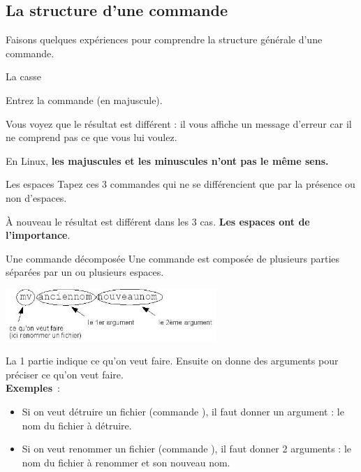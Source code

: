 \documentclass[a4paper,11pt]{style-esi/td}
\begin{document}
	\subsection{La structure d'une commande}

		Faisons quelques expériences pour comprendre
		la structure générale d'une commande.

		\begin{Experience}{La casse} 
			\vspace{-1em}
			\begin{steps}
				\item Entrez la commande  (en majuscule).
			\end{steps}
			Vous voyez que le résultat est différent :
			il vous affiche un message d'erreur 
			car il ne comprend pas ce que vous lui voulez.
			\begin{infobox}
				En Linux, 
				\textbf{les majuscules et les minuscules n'ont pas le même sens.}
			\end{infobox}
		\end{Experience}	
			
		\begin{Experience}{Les espaces} 
			Tapez ces 3 commandes qui ne se différencient 
			que par la présence ou non d'espaces.
			\begin{steps}
			\item \kbd{ls dev1}
			\item \kbd{lsdev1}
			\item \kbd{ls dev 1}
			\end{steps}
			À nouveau le résultat est différent dans les 3 cas. 
			\textbf{Les espaces ont de l'importance}.
		\end{Experience}				

		\begin{theorie}{Une commande décomposée}
			Une commande est composée de plusieurs parties 
			séparées par un ou plusieurs espaces. 
			\begin{center}
				\includegraphics[width=0.6\textwidth]{images/commande.jpg}
			\end{center}
			La 1\iere{} partie indique ce qu'on veut faire. 
			Ensuite on donne des arguments pour préciser ce qu'on veut faire.
			\\
			\textbf{Exemples} :
			\begin{itemize}
			\item 
				Si on veut détruire un fichier (commande ), 
				il faut donner un argument : le nom du fichier à détruire.
			\item 
				Si on veut renommer un fichier (commande ), 
				il faut donner 2 arguments : 
				le nom du fichier à renommer et son nouveau nom.
			\end{itemize}
		\end{theorie}
\end{document}
